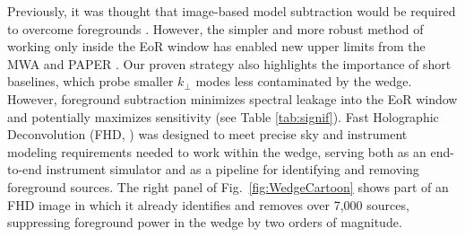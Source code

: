 \documentclass[preprint,11pt]{aastex}
\begin{document}
Previously, it was thought that %
image-based model
subtraction would be required to overcome foregrounds
\citep{liu_et_al2008,juddEarly,harker_et_al2009}. However, 
the simpler and more robust method of working only inside the EoR window has enabled new upper limits
from the MWA \citep{dillon_et_al2013b, dillon_et_al2015} and PAPER
 \citep{parsons_et_al2013, ali_et_al2015}. Our proven strategy also highlights
the importance of short baselines, which probe smaller $k_\perp$ modes %
less contaminated by the wedge. 
However, foreground subtraction minimizes spectral leakage into the EoR window and potentially maximizes sensitivity (see Table \ref{tab:signif}). 
Fast Holographic Deconvolution (FHD, \citealt{sullivan_et_al2012}) was designed to meet precise sky and instrument modeling requirements needed to work within the wedge, serving both as an end-to-end instrument simulator
and as a pipeline for identifying and
removing foreground sources. The right panel of Fig.~\ref{fig:WedgeCartoon} shows part of an FHD image in which it already identifies and removes over 7,000 sources, suppressing foreground power in the wedge by two orders of magnitude. 



\end{document}
